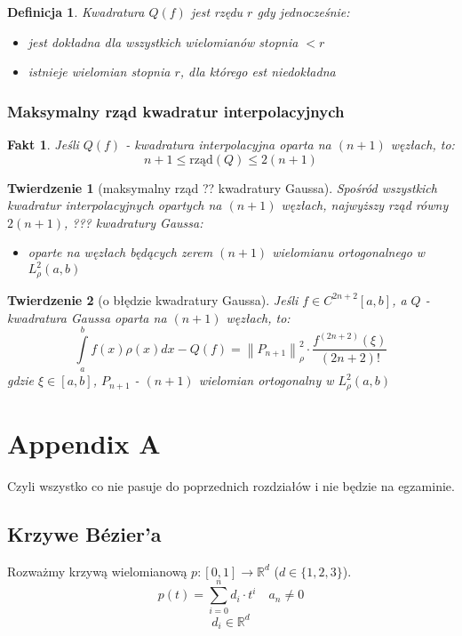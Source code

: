 \documentclass[hidelinks,a4paper,fleqn,oneside]{book}
\newcommand{\RR}{\mathbb{R}}
\newcommand{\ra}{\rightarrow}
\newcommand{\norm}[1]{\left\lVert#1\right\rVert}
\newtheorem{defi}{Definicja}
\newtheorem{fakt}{Fakt}
\newtheorem{twierdz}{Twierdzenie}
\begin{document}
\begin{defi}
	Kwadratura $Q(f)$ jest rzędu $r$ gdy jednocześnie:
	\begin{itemize}
		\item jest dokładna dla wszystkich wielomianów stopnia $< r$
		\item istnieje wielomian stopnia $r$, dla którego est niedokładna 
	\end{itemize}
\end{defi}

\subsection{Maksymalny rząd kwadratur interpolacyjnych}
\begin{fakt} Jeśli $Q(f)$ - kwadratura interpolacyjna oparta na $(n+1)$ węzłach, to:
\[
	n+1 \leq \textrm{rząd}(Q) \leq 2(n+1)
\]
\end{fakt}

\begin{twierdz}[maksymalny rząd ?? kwadratury Gaussa]
	Spośród wszystkich kwadratur interpolacyjnych opartych na $(n+1)$ węzłach, najwyższy rząd równy $2(n+1)$, ??? kwadratury Gaussa:
	\begin{itemize}
		\item oparte na węzłach będących zerem $(n+1)$ wielomianu ortogonalnego w $L^2_\rho(a, b)$
	\end{itemize}
\end{twierdz}

\begin{twierdz}[o błędzie kwadratury Gaussa]
	Jeśli $f \in  C^{2n+2}[a, b]$, a $Q$ - kwadratura Gaussa oparta na $(n+1)$ węzłach, to:
	\[
		\int\limits_a^b f(x)\rho(x)dx - Q(f) = \norm{P_{n+1}}^2_\rho\cdot \frac{f^{(2n+2)}(\xi)}{(2n+2)!}
	\]
	gdzie $\xi \in [a, b]$, $P_{n+1}$ - $(n+1)$ wielomian ortogonalny w $L^2_\rho(a, b)$
\end{twierdz}

\chapter{Appendix A}
Czyli wszystko co nie pasuje do poprzednich rozdziałów i nie będzie na egzaminie.
\section{Krzywe Bézier'a}
	Rozważmy krzywą wielomianową $p: [0, 1] \ra \RR^d$ ($d \in \{1, 2, 3\}$).
	\[
		p(t) = \sum_{i=0}^n d_i \cdot t^i \quad a_n \neq 0
	\]
	\[
		d_i \in \RR^d
	\]
\end{document}
